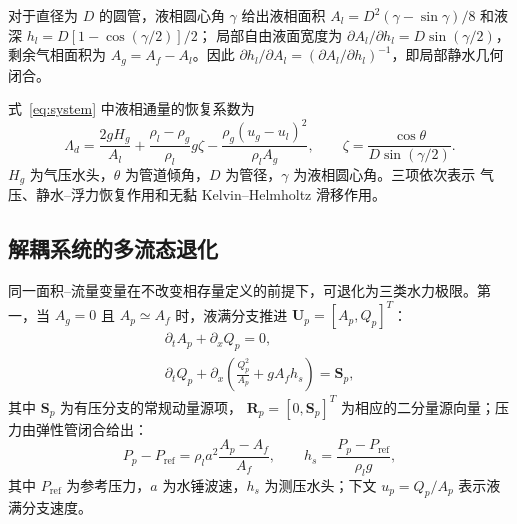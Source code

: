 对于直径为 $D$ 的圆管，液相圆心角 $\gamma$ 给出液相面积
$A_l=D^2(\gamma-\sin\gamma)/8$ 和液深 $h_l=D[1-\cos(\gamma/2)]/2$；
局部自由液面宽度为 $\partial A_l/\partial h_l=D\sin(\gamma/2)$，剩余气相面积为
$A_g=A_f-A_l$。因此
$\partial h_l/\partial A_l=(\partial A_l/\partial h_l)^{-1}$，即局部静水几何闭合。

式~\eqref{eq:system} 中液相通量的恢复系数为
\begin{equation}
\Lambda_d
=\frac{2gH_g}{A_l}
+\frac{\rho_l-\rho_g}{\rho_l}g\zeta
-\frac{\rho_g(u_g-u_l)^2}{\rho_lA_g},
\qquad
\zeta=\frac{\cos\theta}{D\sin(\gamma/2)}.
\label{eq:restoring_coefficient}
\end{equation}
$H_g$ 为气压水头，$\theta$ 为管道倾角，$D$ 为管径，$\gamma$ 为液相圆心角。三项依次表示
气压、静水--浮力恢复作用和无黏 Kelvin--Helmholtz 滑移作用。

\subsection{解耦系统的多流态退化}

同一面积--流量变量在不改变相存量定义的前提下，可退化为三类水力极限。第一，当
$A_g=0$ 且 $A_p\simeq A_f$ 时，液满分支推进
$\mathbf U_p=[A_p,Q_p]^{T}$：
\begin{equation}
\begin{gathered}
\partial_tA_p+\partial_xQ_p=0,\\[3pt]
\partial_tQ_p+
\partial_x\!\left(\frac{Q_p^2}{A_p}+gA_fh_s\right)=\mathbf S_p,
\end{gathered}
\label{eq:liquid_full_branch}
\end{equation}
其中 $\mathbf S_p$ 为有压分支的常规动量源项，
$\mathbf R_p=[0,\mathbf S_p]^{T}$ 为相应的二分量源向量；压力由弹性管闭合给出：
\begin{equation}
P_p-P_{\mathrm{ref}}
=\rho_la^2\frac{A_p-A_f}{A_f},
\qquad
h_s=\frac{P_p-P_{\mathrm{ref}}}{\rho_lg},
\label{eq:elastic}
\end{equation}
其中 $P_{\mathrm{ref}}$ 为参考压力，$a$ 为水锤波速，$h_s$ 为测压水头；下文
$u_p=Q_p/A_p$ 表示液满分支速度。

